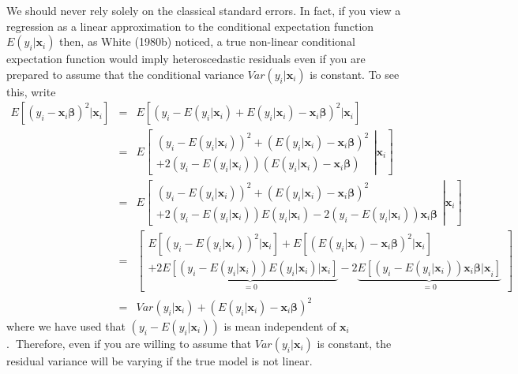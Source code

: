 \documentclass{article}
\begin{document}
We should never rely solely on the classical standard errors. In fact, if
you view a regression as a linear approximation to the conditional
expectation function $E\left( y_{i}|\mathbf{x}_{i}\right) $ then, as White
(1980b) noticed, a true non-linear conditional expectation function would
imply heteroscedastic residuals even if you are prepared to assume that the
conditional variance $Var\left( y_{i}|\mathbf{x}_{i}\right) $ is constant.
To see this, write%
\begin{eqnarray*}
E\left[ \left( y_{i}-\mathbf{x}_{i}\mathbf{\beta }\right) ^{2}|\mathbf{x}_{i}%
\right] &=&E\left[ \left( y_{i}-E\left( y_{i}|\mathbf{x}_{i}\right) +E\left(
y_{i}|\mathbf{x}_{i}\right) -\mathbf{x}_{i}\mathbf{\beta }\right) ^{2}|%
\mathbf{x}_{i}\right] \\
&=&E\left[ \left. 
\begin{array}{c}
\left( y_{i}-E\left( y_{i}|\mathbf{x}_{i}\right) \right) ^{2}+\left( E\left(
y_{i}|\mathbf{x}_{i}\right) -\mathbf{x}_{i}\mathbf{\beta }\right) ^{2} \\ 
+2\left( y_{i}-E\left( y_{i}|\mathbf{x}_{i}\right) \right) \left( E\left(
y_{i}|\mathbf{x}_{i}\right) -\mathbf{x}_{i}\mathbf{\beta }\right)%
\end{array}%
\right\vert \mathbf{x}_{i}\right] \\
&=&E\left[ \left. 
\begin{array}{c}
\left( y_{i}-E\left( y_{i}|\mathbf{x}_{i}\right) \right) ^{2}+\left( E\left(
y_{i}|\mathbf{x}_{i}\right) -\mathbf{x}_{i}\mathbf{\beta }\right) ^{2} \\ 
+2\left( y_{i}-E\left( y_{i}|\mathbf{x}_{i}\right) \right) E\left( y_{i}|%
\mathbf{x}_{i}\right) -2\left( y_{i}-E\left( y_{i}|\mathbf{x}_{i}\right)
\right) \mathbf{x}_{i}\mathbf{\beta }%
\end{array}%
\right\vert \mathbf{x}_{i}\right] \\
&=&\left[ 
\begin{array}{c}
E\left[ \left( y_{i}-E\left( y_{i}|\mathbf{x}_{i}\right) \right) ^{2}|%
\mathbf{x}_{i}\right] +E\left[ \left( E\left( y_{i}|\mathbf{x}_{i}\right) -%
\mathbf{x}_{i}\mathbf{\beta }\right) ^{2}|\mathbf{x}_{i}\right] \\ 
+2\underset{=0}{\underbrace{E\left[ \left( y_{i}-E\left( y_{i}|\mathbf{x}%
_{i}\right) \right) E\left( y_{i}|\mathbf{x}_{i}\right) |\mathbf{x}_{i}%
\right] }}-2\underset{=0}{\underbrace{E\left[ \left( y_{i}-E\left( y_{i}|%
\mathbf{x}_{i}\right) \right) \mathbf{x}_{i}\mathbf{\beta |x}_{i}\right] }}%
\end{array}%
\right] \\
&=&Var\left( y_{i}|\mathbf{x}_{i}\right) +\left( E\left( y_{i}|\mathbf{x}%
_{i}\right) -\mathbf{x}_{i}\mathbf{\beta }\right) ^{2}
\end{eqnarray*}%
where we have used that $\left( y_{i}-E\left( y_{i}|\mathbf{x}_{i}\right)
\right) $ is mean independent of $\mathbf{x}_{i}$.\textbf{\ }Therefore, even
if you are willing to assume that $Var\left( y_{i}|\mathbf{x}_{i}\right) $
is constant, the residual variance will be varying if the true model is not
linear.
\end{document}
